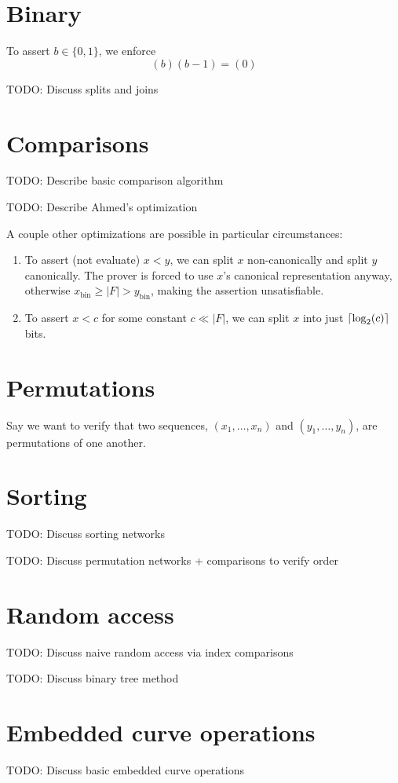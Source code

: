 \documentclass{article}
\DeclarePairedDelimiter\ceil{\lceil}{\rceil}
\begin{document}
\section{Binary}

To assert $b \in \{ 0, 1 \}$, we enforce
\begin{equation}
  (b) (b - 1) = (0)
\end{equation}

TODO: Discuss splits and joins


\section{Comparisons}

TODO: Describe basic comparison algorithm

TODO: Describe Ahmed's optimization

A couple other optimizations are possible in particular circumstances:
\begin{enumerate}
  \item To assert (not evaluate) $x < y$, we can split $x$ non-canonically and split $y$ canonically. The prover is forced to use $x$'s canonical representation anyway, otherwise $x_\mathrm{bin} \ge |F| > y_\mathrm{bin}$, making the assertion unsatisfiable.
  \item To assert $x < c$ for some constant $c \ll |F|$, we can split $x$ into just $\ceil{\log_2(c)}$ bits.
\end{enumerate}


\section{Permutations}

Say we want to verify that two sequences, $(x_1, \dots, x_n)$ and $(y_1, \dots, y_n)$, are permutations of one another.


\section{Sorting}

TODO: Discuss sorting networks

TODO: Discuss permutation networks + comparisons to verify order


\section{Random access}

TODO: Discuss naive random access via index comparisons

TODO: Discuss binary tree method


\section{Embedded curve operations}

TODO: Discuss basic embedded curve operations


{}

\end{document}
